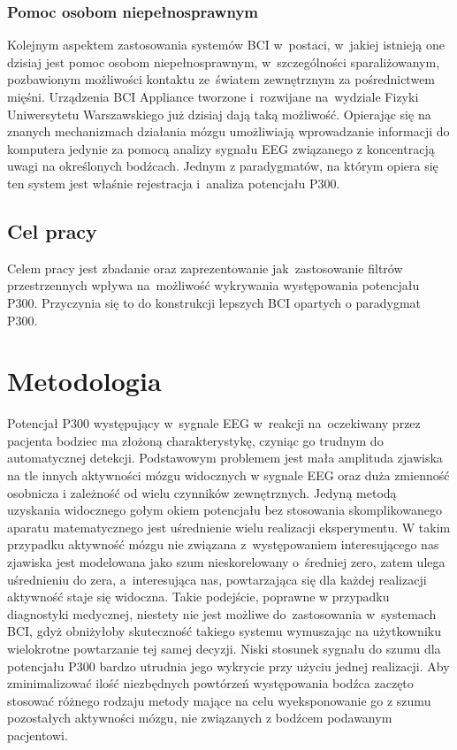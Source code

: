 \documentclass[licencjacka,openright]{pracamgr}
\begin{document}
\subsection{Pomoc osobom niepełnosprawnym}
Kolejnym aspektem zastosowania systemów BCI w~postaci, w~jakiej istnieją one dzisiaj jest pomoc osobom niepełnosprawnym, w~szczególności sparaliżowanym, pozbawionym możliwości kontaktu ze~światem zewnętrznym za pośrednictwem mięśni. Urządzenia BCI Appliance tworzone i~rozwijane na~wydziale Fizyki Uniwersytetu Warszawskiego już dzisiaj dają taką możliwość.
Opierając się na znanych mechanizmach działania mózgu umożliwiają wprowadzanie informacji do komputera jedynie za pomocą analizy sygnału EEG związanego z koncentracją uwagi na określonych bodźcach. Jednym z paradygmatów, na którym opiera się ten system jest właśnie rejestracja i~analiza potencjału P300.

\section{Cel pracy}

Celem pracy jest zbadanie oraz zaprezentowanie jak~zastosowanie filtrów przestrzennych wpływa na~możliwość wykrywania występowania potencjału P300. Przyczynia się to do konstrukcji lepszych BCI opartych o paradygmat P300.

\chapter{Metodologia}
Potencjał P300 występujący w~sygnale EEG w~reakcji na~oczekiwany przez pacjenta bodziec ma złożoną charakterystykę, czyniąc go trudnym do automatycznej detekcji. Podstawowym problemem jest mała amplituda zjawiska na tle innych aktywności mózgu widocznych w sygnale EEG oraz duża zmienność osobnicza i zależność od wielu czynników zewnętrznych. 
Jedyną metodą uzyskania widocznego gołym okiem potencjału bez stosowania skomplikowanego aparatu matematycznego jest uśrednienie wielu realizacji eksperymentu. W takim przypadku aktywność mózgu nie związana z~występowaniem interesującego nas zjawiska jest modelowana jako szum nieskorelowany o~średniej zero, zatem ulega uśrednieniu do zera, a~interesująca nas, powtarzająca się dla każdej realizacji aktywność staje się widoczna. Takie podejście, poprawne w przypadku diagnostyki medycznej, niestety nie jest możliwe do~zastosowania w~systemach BCI, gdyż obniżyłoby skuteczność takiego systemu wymuszając na użytkowniku wielokrotne powtarzanie tej samej decyzji. Niski stosunek sygnału do szumu dla potencjału P300 bardzo utrudnia jego wykrycie przy użyciu jednej realizacji. Aby zminimalizować ilość niezbędnych powtórzeń występowania bodźca zaczęto stosować różnego rodzaju metody mające na celu wyeksponowanie go z szumu pozostałych aktywności mózgu, nie związanych z bodźcem podawanym pacjentowi.
\end{document}

